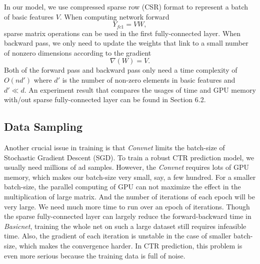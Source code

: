 \documentclass{sig-alternate-05-2015}
\begin{document}
In our model, we use compressed sparse row (CSR) format to represent a batch of basic features $V$. When computing network forward 
\begin{equation}
	Y_{fc1} = VW,
\end{equation}
sparse matrix operations  can be used in the first fully-connected layer. When backward pass,  we only need to update the weights that link to a small number of nonzero dimensions according to the gradient
\begin{equation}
	\nabla(W) = V.
\end{equation}
Both of the forward pass and backward pass only need a time complexity of $O(nd')$ where $d'$ is the number of  non-zero elements in basic features and $d' \ll d$. An experiment result that compares the usages of time and GPU memory with/out sparse fully-connected layer can be found in Section 6.2.
\subsection{Data Sampling}
Another crucial issue in  training is that \emph{Convnet} limits the batch-size of Stochastic Gradient Descent (SGD). To train a robust CTR prediction model, we usually need  millions of ad samples. However, the \emph{Convnet} requires lots of GPU memory, which makes our batch-size very small, say, a few hundred. For a smaller batch-size, the parallel computing of GPU can not maximize the effect in the multiplication of large matrix. And the number of iterations of each epoch will be very large. We need much more time to run over an epoch of iterations. Though the sparse fully-connected layer can largely reduce the forward-backward time in \emph{Basicnet}, training the whole net on such a large dataset still requires infeasible time. Also, the gradient of each iteration is unstable in the case of smaller batch-size, which makes the convergence harder. In CTR prediction, this problem is even more serious because the training data is full of noise.
\end{document}
